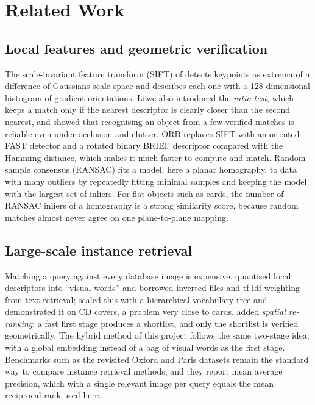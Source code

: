 \chapter{Related Work}
\label{ch:related}


\section{Local features and geometric verification}

The scale-invariant feature transform (SIFT) of \citet{lowe2004sift} detects keypoints as extrema of a difference-of-Gaussians scale space and describes each one with a 128-dimensional histogram of gradient orientations. Lowe also introduced the \emph{ratio test}, which keeps a match only if the nearest descriptor is clearly closer than the second nearest, and showed that recognising an object from a few verified matches is reliable even under occlusion and clutter. ORB \citep{rublee2011orb} replaces SIFT with an oriented FAST detector and a rotated binary BRIEF descriptor compared with the Hamming distance, which makes it much faster to compute and match. Random sample consensus (RANSAC) \citep{fischler1981ransac} fits a model, here a planar homography, to data with many outliers by repeatedly fitting minimal samples and keeping the model with the largest set of inliers. For flat objects such as cards, the number of RANSAC inliers of a homography is a strong similarity score, because random matches almost never agree on one plane-to-plane mapping.

\section{Large-scale instance retrieval}

Matching a query against every database image is expensive. \citet{sivic2003videogoogle} quantised local descriptors into ``visual words'' and borrowed inverted files and tf-idf weighting from text retrieval; \citet{nister2006vocabtree} scaled this with a hierarchical vocabulary tree and demonstrated it on CD covers, a problem very close to cards. \citet{philbin2007spatial} added \emph{spatial re-ranking}: a fast first stage produces a shortlist, and only the shortlist is verified geometrically. The hybrid method of this project follows the same two-stage idea, with a global embedding instead of a bag of visual words as the first stage. Benchmarks such as the revisited Oxford and Paris datasets \citep{radenovic2018revisiting} remain the standard way to compare instance retrieval methods, and they report mean average precision, which with a single relevant image per query equals the mean reciprocal rank used here.

